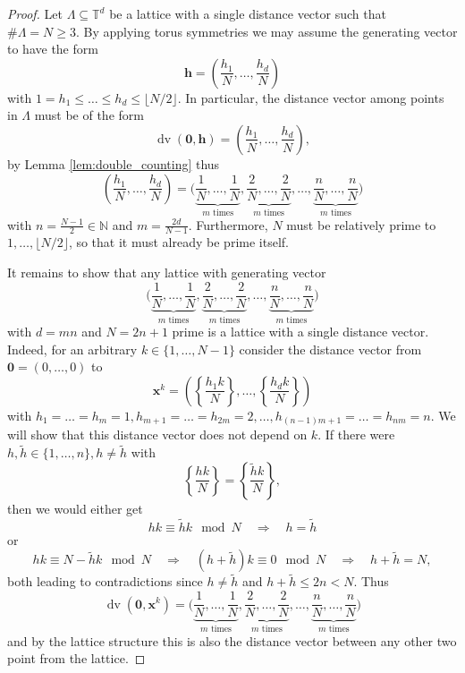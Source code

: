 \documentclass[a4paper,12pt]{article}
\numberwithin{equation}{section}
\theoremstyle{definition}
\newcommand{\bx}{\mathbf{x}}
\newcommand{\bbN}{\mathbb{N}}
\newcommand{\bbT}{\mathbb{T}}
\newcommand{\sbse}{\subseteq}
\newcommand{\dv}{\operatorname{dv}}
\begin{document}
\begin{proof}
    Let $\Lambda \sbse \bbT^d$ be a %
     lattice with a single distance vector such that $\#\Lambda = N \geq 3$. By applying torus symmetries we may assume the generating vector to have the form
    $$
    \mathbf h = \left(\frac{h_1}N, \dots, \frac{h_d}N\right)
    $$
    with $1 = h_1 \leq \dots \leq h_d \leq \lfloor N/2 \rfloor$. In particular, the distance vector among points in $\Lambda$ must be of the form
    $$
    \dv(\mathbf0, \mathbf h) = \left(\frac{h_1}N, \dots, \frac{h_d}N\right),
    $$
    by Lemma \ref{lem:double_counting} thus
    $$
    \left(\frac{h_1}N, \dots, \frac{h_d}N\right) = \bigg(\underbrace{\frac1N, \dots, \frac1N}_{m \text{ times}}, \underbrace{\frac2N, \dots, \frac2N}_{m \text{ times}}, \dots, \underbrace{\frac nN, \dots, \frac nN}_{m \text{ times}}\bigg)
    $$
    with $n = \frac{N-1}2 \in \bbN$ and $m = \frac{2d}{N-1}$. Furthermore, $N$ must be relatively prime to $1, \dots, \lfloor N/2\rfloor$, so that it must already be prime itself.

    It remains to show that any lattice with generating vector
    $$
    \bigg(\underbrace{\frac1N, \dots, \frac1N}_{m \text{ times}}, \underbrace{\frac2N, \dots, \frac2N}_{m \text{ times}}, \dots, \underbrace{\frac nN, \dots, \frac nN}_{m \text{ times}}\bigg)
    $$
    with $d=mn$ and $N=2n+1$ prime is a lattice with a single distance vector. Indeed, for an arbitrary $k \in \{1, \dots, N-1\}$ consider the distance vector from $\mathbf{0} = (0, \dots, 0)$ to
    $$
    \bx^k = \left(\left\{\frac{h_1 k}N\right\}, \dots, \left\{\frac{h_d k}N\right\}\right)
    $$
    with $h_1 = \dots = h_m = 1, h_{m+1} = \dots = h_{2m} = 2, \dots, h_{(n-1)m+1} = \dots = h_{nm} = n$. We will show that this distance vector does not depend on $k$. If there were $h, \tilde h \in \{1, \dots, n\}, h \neq \tilde h$ with
    $$
    \left\{\frac{hk}N\right\} = \left\{\frac{\tilde hk}N\right\},
    $$
    then we would either get
    $$
    hk \equiv \tilde h k \mod N \quad \Rightarrow \quad h = \tilde h
    $$
    or
    $$
    hk \equiv N - \tilde h k \mod N \quad \Rightarrow \quad (h + \tilde h) k \equiv 0 \mod N \quad \Rightarrow \quad h + \tilde h = N,
    $$
    both leading to contradictions since $h \neq \tilde h$ and $h + \tilde h \leq 2n < N$. Thus
    $$
    \dv(\mathbf 0, \bx^k) = \bigg(\underbrace{\frac1N, \dots, \frac1N}_{m \text{ times}}, \underbrace{\frac2N, \dots, \frac2N}_{m \text{ times}}, \dots, \underbrace{\frac nN, \dots, \frac nN}_{m \text{ times}}\bigg)
    $$
    and by the lattice structure this is also the distance vector between any other two point from the lattice.
\end{proof}
\end{document}
